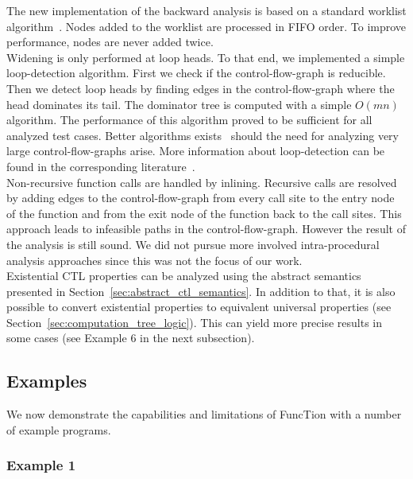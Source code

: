 \documentclass[11pt,a4paper,titlepage]{article}
\theoremstyle{definition}
\begin{document}
The new implementation of the backward analysis is based on a standard worklist algorithm~\cite{DBLP:books/daglib/0098888}. 
Nodes added to the worklist are processed in FIFO order. To improve performance, nodes are never added twice.\\ 

Widening is only performed at loop heads. To that end, we implemented a simple loop-detection algorithm. 
First we check if the control-flow-graph is reducible. Then we detect loop heads by 
finding edges in the control-flow-graph where the head dominates its tail. The dominator tree is computed
with a simple $O(mn)$ algorithm. The performance of this algorithm proved to be sufficient for all 
analyzed test cases. Better algorithms exists~\cite{Lengauer:1979:FAF:357062.357071} should the need for 
analyzing very large control-flow-graphs arise. 
More information about loop-detection can be found in the corresponding literature~\cite{DBLP:books/aw/AhoSU87}.\\

Non-recursive function calls are handled by inlining. Recursive calls are resolved by adding edges to the control-flow-graph
from every call site to the entry node of the function and from the exit node of the function back to the call sites. 
This approach leads to infeasible paths in the control-flow-graph. However the result of the analysis is still sound.
We did not pursue more involved intra-procedural analysis approaches since this was not the focus of our work.\\

Existential CTL properties can be analyzed using the abstract semantics presented in Section~\ref{sec:abstract_ctl_semantics}. In addition to that, 
it is also possible to convert existential properties to equivalent universal properties (see Section~\ref{sec:computation_tree_logic}). 
This can yield more precise results in some cases (see Example 6 in the next subsection).\\


\subsection{Examples}\label{sec:implementation_examples}

We now demonstrate the capabilities and limitations of FuncTion with a number of example programs. 

\subsubsection*{Example 1}
\end{document}

